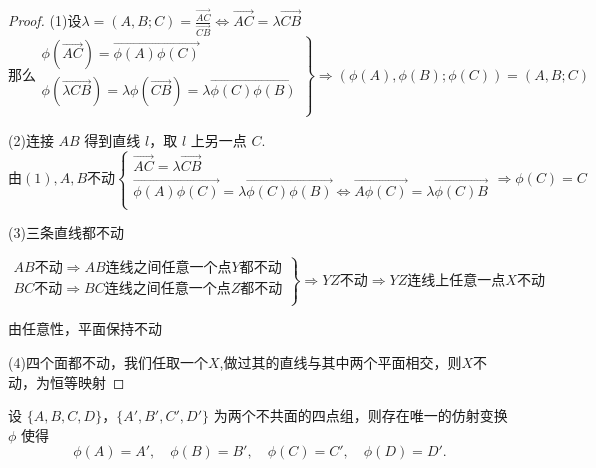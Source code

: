 \documentclass[lang=cn,10pt,thmcnt=section]{elegantbook}
\begin{document}
\begin{proof}

    (1)设$\lambda=(A, B; C) = \frac{\overrightarrow{AC}}{\overrightarrow{CB}} \Leftrightarrow \overrightarrow{AC}=\lambda\overrightarrow{CB}$
    $$
\text{那么}\left. \begin{array}{r}
	\phi \left( \overrightarrow{AC} \right) =\overrightarrow{\phi \left( A \right) \phi \left( C \right) }\\
	\phi \left( \overrightarrow{\lambda CB} \right) =\lambda \phi \left( \overrightarrow{CB} \right) =\lambda \overrightarrow{\phi \left( C \right) \phi \left( B \right) }\\
\end{array} \right\} \Rightarrow \left( \phi \left( A \right) ,\phi \left( B \right) ;\phi \left( C \right) \right) =\left( A,B;C \right) 
$$

    (2)连接 $AB$ 得到直线 $l$，取 $l$ 上另一点 $C$.
    $$
\text{由}\left( 1 \right) ,A,B\text{不动}\begin{cases}
	\overrightarrow{AC}=\lambda \overrightarrow{CB}\\
	\overrightarrow{\phi \left( A \right) \phi \left( C \right) }=\lambda \overrightarrow{\phi \left( C \right) \phi \left( B \right) }\Leftrightarrow \overrightarrow{A\phi \left( C \right) }=\lambda \overrightarrow{\phi \left( C \right) B}\\
\end{cases}\Rightarrow \phi \left( C \right) =C
$$

    (3)三条直线都不动

    $$
\left. \begin{array}{r}
	AB\text{不动}\Rightarrow AB\text{连线之间任意一个点}Y\text{都不动}\\
	BC\text{不动}\Rightarrow BC\text{连线之间任意一个点}Z\text{都不动}\\
\end{array} \right\} \Rightarrow YZ\text{不动}\Rightarrow YZ\text{连线上任意一点}X\text{不动}
$$

由任意性，平面保持不动

    (4)四个面都不动，我们任取一个$X$,做过其的直线与其中两个平面相交，则$X$不动，为恒等映射

    
\end{proof}


\begin{theorem}
    设 $\{A, B, C, D\}$，$\{A', B', C', D'\}$ 为两个不共面的四点组，则存在唯一的仿射变换 $\phi$ 使得
    \[
    \phi(A) = A', \quad \phi(B) = B', \quad \phi(C) = C', \quad \phi(D) = D'.
    \]
    \end{theorem}
    
\end{document}
